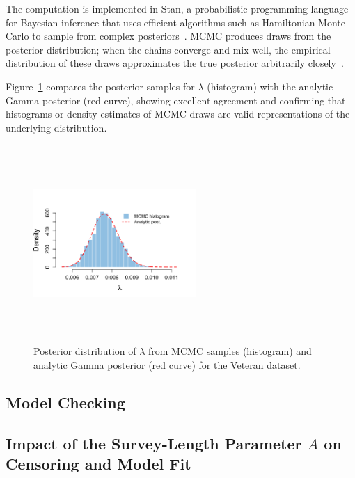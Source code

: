 The computation is implemented in Stan, a probabilistic programming language for Bayesian inference that uses efficient algorithms such as Hamiltonian Monte Carlo to sample from complex posteriors~\cite{JSSv076i01}. MCMC produces draws from the posterior distribution; when the chains converge and mix well, the empirical distribution of these draws approximates the true posterior arbitrarily closely~\cite{https://doi.org/10.1111/2041-210X.12681}.

\begin{example}
Figure~\ref{fig:exp veteran} compares the posterior samples for $\lambda$ (histogram) with the analytic Gamma posterior (red curve), showing excellent agreement and confirming that histograms or density estimates of MCMC draws are valid representations of the underlying distribution.
\begin{figure}[H]
    \centering
    \includegraphics[height=7.5cm, width=0.55\textwidth]{images/veteran_post_lam.png}
    \caption{{\small Posterior distribution of $\lambda$ from MCMC samples (histogram) and analytic Gamma posterior (red curve) for the Veteran dataset.}}
    \label{fig:exp veteran}
\end{figure}
\end{example}









\subsection{Model Checking}\label{sec:model checking}

\subsection{Impact of the Survey-Length Parameter \texorpdfstring{$A$}{A} on Censoring and Model Fit}
\label{Impact of A}

